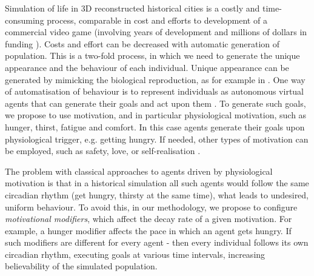 
Simulation of life in 3D reconstructed historical cities is a costly and time-consuming process, comparable in cost and efforts to development of a commercial video game (involving years of development and millions of dollars in funding \cite{Crysis_development_cost}). Costs and effort can be decreased with automatic generation of population. This is a two-fold process, in which we need to generate the unique appearance and the behaviour of each individual. Unique appearance can be generated by mimicking the biological reproduction, as for example in \cite{trescak2012v}. One way of automatisation of behaviour is to represent individuals as autonomous virtual agents that can generate their goals and act upon them \cite{virtualAgents_planning}. To generate such goals, we propose to use motivation, and in particular physiological motivation, such as hunger, thirst, fatigue and comfort. In this case agents generate their goals upon physiological trigger, e.g. getting hungry. If needed, other types of motivation can be employed, such as safety, love, or self-realisation \cite{maslow1970} \cite{alderfer1969}. 

The problem with classical approaches to agents driven by physiological motivation is that in a historical simulation all such agents would follow the same circadian rhythm (get hungry, thirsty at the same time), what leads to undesired, uniform behaviour. To avoid this, in our methodology, we propose to configure \textit{motivational modifiers}, which affect the decay rate of a given motivation. For example, a hunger modifier affects the pace in which an agent gets hungry. If such modifiers are different for every agent - then every individual follows its own circadian rhythm, executing goals at various time intervals, increasing believability of the simulated population.

